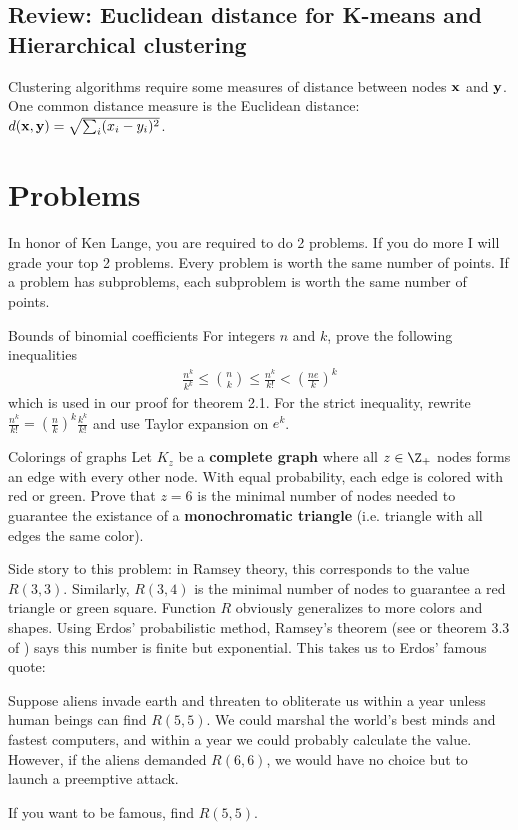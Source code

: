 \documentclass[./some_latex_template.tex]{subfiles}
\begin{document}
\subsection{Review: Euclidean distance for K-means and Hierarchical clustering}

Clustering algorithms require some measures of distance between nodes $\mathbf{x}$ and $\mathbf{y}$. One common distance measure is the Euclidean distance: $d(\mathbf{x}, \mathbf{y}) = \sqrt{\sum_{i}(x_i - y_i)^2}$. 

\section{Problems}

In honor of Ken Lange, you are required to do 2 problems. If you do more I will grade your top 2 problems. Every problem is worth the same number of points. If a problem has subproblems, each subproblem is worth the same number of points.

\begin{problembox}{Bounds of binomial coefficients}{}
For integers $n$ and $k$, prove the following inequalities
\begin{align*}
	\frac{n^k}{k^k} \le {n \choose k} \le \frac{n^k}{k!} < \left( \frac{ne}{k}\right)^k
\end{align*}
which is used in our proof for theorem 2.1. For the strict inequality, rewrite $\frac{n^k}{k!} = \left(\frac{n}{k}\right)^k \frac{k^k}{k!}$ and use Taylor expansion on $e^k$.
\end{problembox}

\begin{problembox}{Colorings of graphs}{}
Let $K_z$ be a \textbf{complete graph} where all $z \in \Z_+$ nodes forms an edge with every other node. With equal probability, each edge is colored with red or green. Prove that $z=6$ is the minimal number of nodes needed to guarantee the existance of a \textbf{monochromatic triangle} (i.e. triangle with all edges the same color).
\end{problembox}
Side story to this problem: in Ramsey theory, this corresponds to the value $R(3, 3)$. Similarly, $R(3, 4)$ is the minimal number of nodes to guarantee a red triangle or green square. Function $R$ obviously generalizes to more colors and shapes. Using Erdos' probabilistic method, Ramsey's theorem (see \cite{sebv} or theorem 3.3 of \cite{van2001course}) says this number is finite but exponential.  This takes us to Erdos' famous quote:

\begin{displayquote}
Suppose aliens invade earth and threaten to obliterate us within a year unless human beings can find $R(5, 5)$. We could marshal the world's best minds and fastest computers, and within a year we could probably calculate the value. However, if the aliens demanded $R(6, 6)$, we would have no choice but to launch a preemptive attack.
\end{displayquote}
If you want to be famous, find $R(5, 5)$. 


\end{document}
